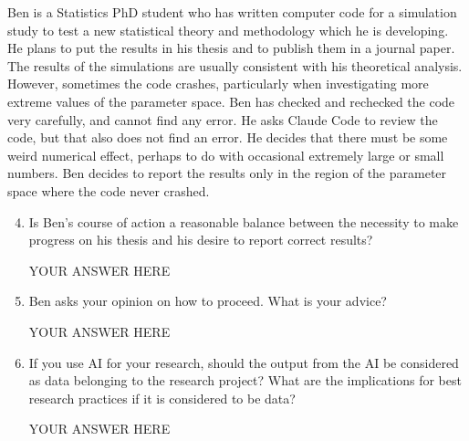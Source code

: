 \documentclass[12pt]{article}
\begin{document}
Ben is a Statistics PhD student who has written computer code for a simulation study to test a new statistical theory and methodology which he is developing.
He plans to put the results in his thesis and to publish them in a journal paper.
The results of the simulations are usually consistent with his theoretical analysis. 
However, sometimes the code crashes, particularly when investigating more extreme values of the parameter space.
Ben has checked and rechecked the code very carefully, and cannot find any error.
He asks Claude Code to review the code, but that also does not find an error.
He decides that there must be some weird numerical effect, perhaps to do with occasional extremely large or small numbers.
Ben decides to report the results only in the region of the parameter space where the code never crashed. 
\begin{enumerate}\setcounter{enumi}{3}
\item Is Ben's course of action a reasonable balance between the necessity to make progress on his thesis and his desire to report correct results? 

YOUR ANSWER HERE

\item Ben asks your opinion on how to proceed. What is your advice?

YOUR ANSWER HERE

\item If you use AI for your research, should the output from the AI be considered as data belonging to the research project? What are the implications for best research practices if it is considered to be data? 

YOUR ANSWER HERE
  
\end{enumerate}
\end{document}
